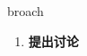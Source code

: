 
\begin{frame}
{\huge broach}
\begin{center}
\begin{enumerate}\Large
  \item \textbf{提出讨论}
\end{enumerate}
\end{center}
\end{frame}
